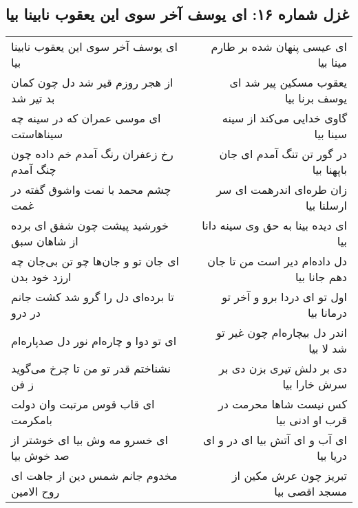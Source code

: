 \begin{center}
\section*{غزل شماره ۱۶: ای یوسف آخر سوی این یعقوب نابینا بیا}
\label{sec:0016}
\begin{longtable}{l p{0.5cm} r}
ای یوسف آخر سوی این یعقوب نابینا بیا
&&
ای عیسی پنهان شده بر طارم مینا بیا
\\
از هجر روزم قیر شد دل چون کمان بد تیر شد
&&
یعقوب مسکین پیر شد ای یوسف برنا بیا
\\
ای موسی عمران که در سینه چه سیناهاستت
&&
گاوی خدایی می‌کند از سینه سینا بیا
\\
رخ زعفران رنگ آمدم خم داده چون چنگ آمدم
&&
در گور تن تنگ آمدم ای جان باپهنا بیا
\\
چشم محمد با نمت واشوق گفته در غمت
&&
زان طره‌ای اندرهمت ای سر ارسلنا بیا
\\
خورشید پیشت چون شفق ای برده از شاهان سبق
&&
ای دیده بینا به حق وی سینه دانا بیا
\\
ای جان تو و جان‌ها چو تن بی‌جان چه ارزد خود بدن
&&
دل داده‌ام دیر است من تا جان دهم جانا بیا
\\
تا برده‌ای دل را گرو شد کشت جانم در درو
&&
اول تو ای دردا برو و آخر تو درمانا بیا
\\
ای تو دوا و چاره‌ام نور دل صدپاره‌ام
&&
اندر دل بیچاره‌ام چون غیر تو شد لا بیا
\\
نشناختم قدر تو من تا چرخ می‌گوید ز فن
&&
دی بر دلش تیری بزن دی بر سرش خارا بیا
\\
ای قاب قوس مرتبت وان دولت بامکرمت
&&
کس نیست شاها محرمت در قرب او ادنی بیا
\\
ای خسرو مه وش بیا ای خوشتر از صد خوش بیا
&&
ای آب و ای آتش بیا ای در و ای دریا بیا
\\
مخدوم جانم شمس دین از جاهت ای روح الامین
&&
تبریز چون عرش مکین از مسجد اقصی بیا
\\
\end{longtable}
\end{center}
